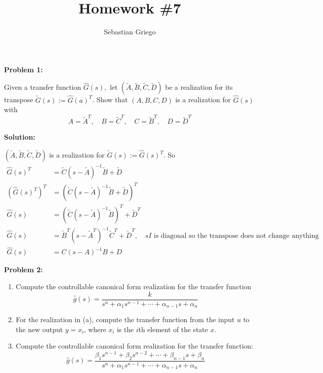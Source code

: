 \documentclass[12pt]{article}
\newenvironment{problem}[1]{
    \textbf{Problem #1:}
}{
    \rmfamily \vspace{1em}
}
\newenvironment{solution}{
    \textbf{Solution:}
    
}{
    
    \vspace{2em}
}
\begin{document}
\title{Homework \#7}  %
\author{Sebastian Griego}  %
\maketitle


\begin{problem}{1}
    Given a transfer function \(\hat{G}(s),\) let \((\tilde{A}, \tilde{B}, \tilde{C}, \tilde{D})\) be a realization
    for its transpose \(\tilde{G}(s) := \hat{G}(a)^T\). Show that \((A, B, C, D)\) is a realization for \(\hat{G}(s)\) with
    \[
        A = \tilde{A}^T, \quad B = \tilde{C}^T, \quad C = \tilde{B}^T, \quad D = \tilde{D}^T
    \]
\end{problem}

\begin{solution}
    \((\tilde{A}, \tilde{B}, \tilde{C}, \tilde{D})\) is a realization for \(\tilde{G}(s) := \hat{G}(s)^T\). So
    \[
        \begin{aligned}
            \hat{G}(s)^T &= \tilde{C}(s - \tilde{A})^{-1}\tilde{B} + \tilde{D} \\
            (\hat{G}(s)^T)^T &= (\tilde{C}(s - \tilde{A})^{-1}\tilde{B} + \tilde{D})^T \\
            \hat{G}(s) &= (\tilde{C}(s - \tilde{A})^{-1}\tilde{B})^T + \tilde{D}^T \\
            \hat{G}(s) &= \tilde{B}^T(s - \tilde{A}^T)^{-1}\tilde{C}^T + \tilde{D}^T, \quad sI\text{ is diagonal so the transpose does not change anything} \\
            \hat{G}(s) &= C(s - A)^{-1}B + D
        \end{aligned}
    \]
    
\end{solution}

\newpage

\begin{problem}{2}
    \begin{enumerate}[label=(\alph*)]
        \item Compute the controllable canonical form realization for the transfer function
        \[
            \hat{g}(s) = \frac{k}{s^n + \alpha_1s^{n-1} + \cdots + \alpha_{n-1}s + \alpha_n}
        \]
        \item For the realization in (a), compute the transfer function from the input \(u\) to the new output \(y = x_i\), where \(x_i\) is the \(i\)th element of the state \(x\).
        \item  Compute the controllable canonical form realization for the transfer function:
        \[
            \hat{g}(s) = \frac{\beta_1s^{n-1} + \beta_2s^{n-2} + \cdots + \beta_{n-1}s + \beta_n}{s^n + \alpha_1s^{n-1} + \cdots + \alpha_{n-1}s + \alpha_n}
        \]
    \end{enumerate}
\end{problem}
\end{document}
